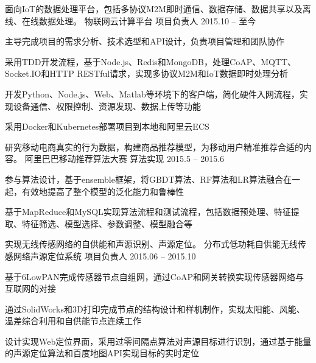 


\begin{cventries}


\cventry
{面向IoT的数据处理平台，包括多协议M2M即时通信、数据存储、数据共享以及离线、在线数据处理。} %
{物联网云计算平台} %
{项目负责人} %
{2015.10 -- 至今} %
{ %
\begin{cvitems}
\item {主导完成项目的需求分析、技术选型和API设计，负责项目管理和团队协作}
\item {采用TDD开发流程，基于Node.js、Redis和MongoDB，处理CoAP、MQTT、Socket.IO和HTTP RESTful请求，实现多协议M2M和IoT数据即时处理分析}
\item {开发Python、Node.js、Web、Matlab等环境下的客户端，简化硬件入网流程，实现设备通信、权限控制、资源发现、数据上传等功能}
\item{采用Docker和Kubernetes部署项目到本地和阿里云ECS}
\end{cvitems}
}

\cventry
{研究移动电商真实的行为数据，构建商品推荐模型，为移动用户精准推荐合适的内容。} %
{阿里巴巴移动推荐算法大赛} %
{算法实现} %
{2015.5 -- 2015.6} %
{ %
\begin{cvitems}
\item {参与算法设计，基于ensemble框架，将GBDT算法、RF算法和LR算法融合在一起，有效地提高了整个模型的泛化能力和鲁棒性}
\item {基于MapReduce和MySQL实现算法流程和测试流程，包括数据预处理、特征提取、特征筛选、模型选择、参数调整、模型融合等}
\end{cvitems}
}


\cventry
{实现无线传感网络的自供能和声源识别、声源定位。} %
{分布式低功耗自供能无线传感网络声源定位系统} %
{项目负责人} %
{2015.06 -- 2015.10} %
{ %
\begin{cvitems}
\item {基于6LowPAN完成传感器节点自组网，通过CoAP和网关转换实现传感器网络与互联网的对接}
\item {通过SolidWorks和3D打印完成节点的结构设计和样机制作，实现太阳能、风能、温差综合利用和自供能节点连续工作}
\item{设计实现Web定位界面，采用过零间隔点算法对声源目标进行识别，通过基于能量的声源定位算法和百度地图API实现目标的实时定位}
\end{cvitems} 
}


\end{cventries}
